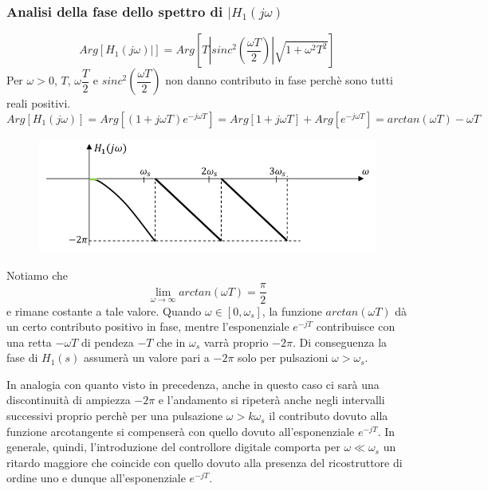 \documentclass[a4paper]{report}
\begin{document}
\subsubsection{Analisi della fase dello spettro di $|H_1(j \omega)$}
\[
Arg \left[H_1(j \omega)|\right] = Arg \left[T \left|sinc^2 \left(
  \dfrac{\omega T}{2}\right)\right| \sqrt{1 + \omega^2 T^2}\right] 
\]
Per $\omega > 0$, $T$, $\omega \dfrac{T}{2}$ e $sinc^2 \left(
\dfrac{\omega T}{2}\right)$ non danno contributo in fase perch\`e sono
tutti reali positivi.
\[
Arg \left[H_1(j \omega)\right] = Arg \left[ (1 + j \omega T) e^{-j
    \omega T}\right] = Arg \left[1 + j \omega T \right] + Arg
\left[ e^{-j  \omega T} \right] = arctan(\omega T) - \omega T
\]
\begin{figure}[!h]
  \begin{center}
    \includegraphics[scale=0.5]{./figures/ricostruttoreOrdineUnoSpettroFase.png}
    \caption{}\label{fig:}
  \end{center}
\end{figure}
Notiamo che
\[
\lim_{\omega \to \infty} arctan(\omega T) = \dfrac{\pi}{2}
\]
e rimane costante a tale valore. Quando $\omega \in [0, \omega_s]$, la
funzione $arctan(\omega T)$ d\`a un certo contributo positivo in fase,
mentre l'esponenziale $e^{-jT}$ contribuisce con una retta $-\omega T$
di pendeza $-T$ che in $\omega_s$ varr\`a proprio $-2 \pi$. Di
conseguenza la fase di $H_1(s)$ assumer\`a un valore pari a $-2 \pi$
solo per pulsazioni $\omega > \omega_s$.

In analogia con quanto visto in precedenza, anche in questo caso ci
sar\`a una discontinuit\`a di ampiezza $-2 \pi$ e l'andamento si
ripeter\`a anche negli intervalli successivi proprio perch\`e per una
pulsazione $\omega > k\omega_s$ il contributo dovuto alla funzione
arcotangente si compenser\`a con quello dovuto all'esponenziale
$e^{-jT}$. In generale, quindi, l'introduzione del controllore
digitale comporta per $\omega \ll \omega_s$ un ritardo maggiore che
coincide con quello dovuto alla presenza del ricostruttore di ordine
uno e dunque all'esponenziale $e^{-j T}$.
\end{document}
